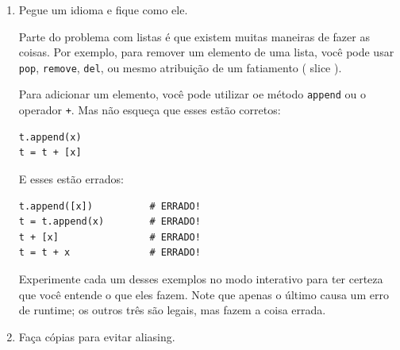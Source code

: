 \begin{enumerate}
\item Pegue um idioma e fique como ele.


Parte do problema com listas é que existem muitas maneiras 
de fazer as coisas. Por exemplo, para remover um elemento
de uma lista, você pode usar {\tt pop}, {\tt remove}, {\tt del},
ou mesmo atribuição de um fatiamento ( slice ).

Para adicionar um elemento, você pode utilizar oe método {\tt append} 
ou o operador {\tt +}. Mas não esqueça que esses estão corretos:



\beforeverb
\begin{verbatim}
t.append(x)
t = t + [x]
\end{verbatim}
\afterverb

E esses estão errados:

\beforeverb
\begin{verbatim}
t.append([x])          # ERRADO!
t = t.append(x)        # ERRADO!
t + [x]                # ERRADO!
t = t + x              # ERRADO!
\end{verbatim}
\afterverb

Experimente cada um desses exemplos no modo interativo para ter
certeza que você entende o que eles fazem. Note que apenas o último
causa um erro de runtime; os outros três são legais, mas fazem a coisa
errada.



\item Faça cópias para evitar aliasing.






\end{enumerate}
